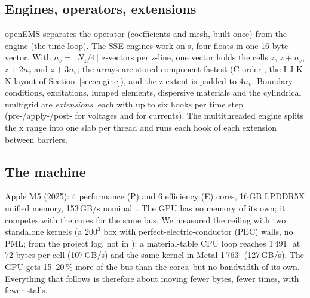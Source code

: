 \subsection{Engines, operators, extensions}\label{sec:engines}
openEMS separates the operator (coefficients and mesh, built once) from the engine (the time loop). The SSE engines
work on s, four floats in one 16-byte vector. With $n_v=\lceil N_z/4\rceil$ z-vectors per z-line, one
vector holds the cells $z$, $z+n_v$, $z+2n_v$ and $z+3n_v$; the arrays are stored component-fastest (C order
\code{[x][y][z\_v][component]}, the I-J-K-N layout of Section~\ref{sec:engine}), and the z extent is padded to $4n_v$.
Boundary conditions, excitations, lumped elements, dispersive materials and the cylindrical multigrid are
\emph{extensions}, each with up to six hooks per time step (pre-/apply-/post- for voltages and for currents). The
multithreaded engine splits the x range into one slab per thread and runs each hook of each extension between
barriers.

\subsection{The machine}
Apple M5 (2025): 4 performance (P) and 6 efficiency (E) cores, 16\,GB LPDDR5X unified memory, 153\,GB/s
nominal~\cite{m5}. The GPU has no memory of its own; it competes with the cores for the same bus. We measured the
ceiling with two standalone kernels (a $200^3$ box with perfect-electric-conductor (PEC) walls, no PML; from the
project log, not in ): a material-table CPU loop reaches 1\,491\,\MC\ at 72 bytes per cell (107\,GB/s)
and the same kernel in Metal 1\,763\,\MC\ (127\,GB/s). The GPU gets 15--20\,\% more of the bus than the cores, but no
bandwidth of its own. Everything that follows is therefore about moving fewer bytes, fewer times, with fewer stalls.
